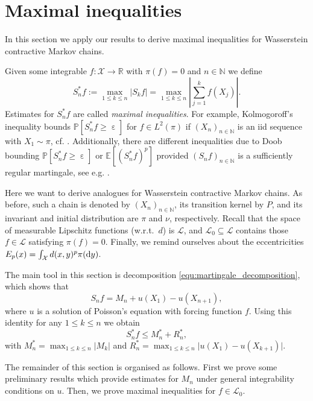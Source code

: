 \documentclass[12pt]{article}
\theoremstyle{plain}
\renewcommand{\d}{{\rm d}}
\newcommand{\N}{\mathbb{N}}
\newcommand{\R}{\mathbb{R}}
\newcommand{\cX}{\mathcal{X}}
\DeclareMathOperator{\eps}{\varepsilon}
\begin{document}
{\section{Maximal inequalities}\label{sec:applications}
In this section we apply our results to derive maximal inequalities for Wasserstein contractive Markov chains.


Given some integrable $f \colon \cX \to \R$ with $\pi(f)=0$ and $n \in \N$ we define 
\[
S_n^* f := \max_{1 \leq k \leq n} \vert S_k f \vert = \max_{1 \leq k \leq n} \left\vert \sum_{j=1}^k f(X_j) \right\vert.
\]
Estimates for $S_n^*f$ are called \textit{maximal inequalities}. 
For example, Kolmogoroff's inequality bounds $\mathbb{P}[S_n^*f \geq \eps]$ for $f \in L^2(\pi)$ if $(X_n)_{n \in \N}$ is an iid sequence with $X_1 \sim \pi$, cf. \cite[Chapter 9]{dudley2002real}.
Additionally, there are different inequalities due to Doob bounding $\mathbb{P}[S_n^*f \geq \eps]$ or $\mathbb{E}[(S_n^*f)^p]$ provided $(S_n f)_{n \in \N}$ is a sufficiently regular martingale, see e.g. \cite{revuz1999continuous}.  

 
Here we want to derive analogues for Wasserstein contractive Markov chains. 
As before, such a chain is denoted by $(X_n)_{n \in \N}$, its transition kernel by $P$, and its invariant and initial distribution are $\pi$ and $\nu$, respectively.
Recall that the space of measurable Lipschitz functions (w.r.t.~$d$) is $\mathscr{L}$,  and $\mathscr{L}_0\subseteq\mathscr{L}$ contains those $f \in \mathscr{L}$ satisfying $\pi(f)=0$. 
Finally, we remind ourselves about the eccentricities $E_p(x)=\int_\cX d(x,y)^p \pi(\d y)$. 

The main tool in this section is decomposition \eqref{equ:martingale_decomposition}, which shows that 
\[
S_n f = M_n + u(X_1) - u(X_{n+1}),
\]
where $u $ is a solution of Poisson's equation with forcing function $f$. 
Using this identity for any $1 \leq k \leq n$ we obtain 
\begin{equation}\label{equ:maximal_decomposition}
S_n^*f \leq M_n^* + R_n^*,
\end{equation}
with $M_n^* = \max_{1 \leq k \leq n} \vert M_k\vert$ and $R_n^* = \max_{1 \leq k \leq n} \vert u(X_1) - u(X_{k+1}) \vert $.



The remainder of this section is organised as follows. First we prove some preliminary results which provide estimates for $M_n$ under general integrability conditions on $u$.
Then, we prove maximal inequalities for $f \in \mathscr{L}_0$.  

}
\end{document}
